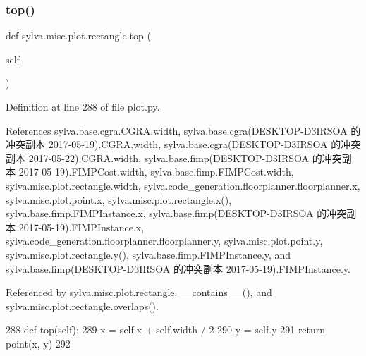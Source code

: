 \subsubsection{\texorpdfstring{top()}{top()}}
{\footnotesize\ttfamily def sylva.\+misc.\+plot.\+rectangle.\+top (\begin{DoxyParamCaption}\item[{}]{self }\end{DoxyParamCaption})}



Definition at line 288 of file plot.\+py.



References sylva.\+base.\+cgra.\+C\+G\+R\+A.\+width, sylva.\+base.\+cgra(\+D\+E\+S\+K\+T\+O\+P-\/\+D3\+I\+R\+S\+O\+A 的冲突副本 2017-\/05-\/19).\+C\+G\+R\+A.\+width, sylva.\+base.\+cgra(\+D\+E\+S\+K\+T\+O\+P-\/\+D3\+I\+R\+S\+O\+A 的冲突副本 2017-\/05-\/22).\+C\+G\+R\+A.\+width, sylva.\+base.\+fimp(\+D\+E\+S\+K\+T\+O\+P-\/\+D3\+I\+R\+S\+O\+A 的冲突副本 2017-\/05-\/19).\+F\+I\+M\+P\+Cost.\+width, sylva.\+base.\+fimp.\+F\+I\+M\+P\+Cost.\+width, sylva.\+misc.\+plot.\+rectangle.\+width, sylva.\+code\+\_\+generation.\+floorplanner.\+floorplanner.\+x, sylva.\+misc.\+plot.\+point.\+x, sylva.\+misc.\+plot.\+rectangle.\+x(), sylva.\+base.\+fimp.\+F\+I\+M\+P\+Instance.\+x, sylva.\+base.\+fimp(\+D\+E\+S\+K\+T\+O\+P-\/\+D3\+I\+R\+S\+O\+A 的冲突副本 2017-\/05-\/19).\+F\+I\+M\+P\+Instance.\+x, sylva.\+code\+\_\+generation.\+floorplanner.\+floorplanner.\+y, sylva.\+misc.\+plot.\+point.\+y, sylva.\+misc.\+plot.\+rectangle.\+y(), sylva.\+base.\+fimp.\+F\+I\+M\+P\+Instance.\+y, and sylva.\+base.\+fimp(\+D\+E\+S\+K\+T\+O\+P-\/\+D3\+I\+R\+S\+O\+A 的冲突副本 2017-\/05-\/19).\+F\+I\+M\+P\+Instance.\+y.



Referenced by sylva.\+misc.\+plot.\+rectangle.\+\_\+\+\_\+contains\+\_\+\+\_\+(), and sylva.\+misc.\+plot.\+rectangle.\+overlaps().


\begin{DoxyCode}
288         \textcolor{keyword}{def }top(self):
289             x = self.x + self.width / 2
290             y = self.y
291             \textcolor{keywordflow}{return} point(x, y)
292 
\end{DoxyCode}
\mbox{\label{classsylva_1_1misc_1_1plot_1_1rectangle_ac763b52f6d533f4b006421eae5f81b56}} 
